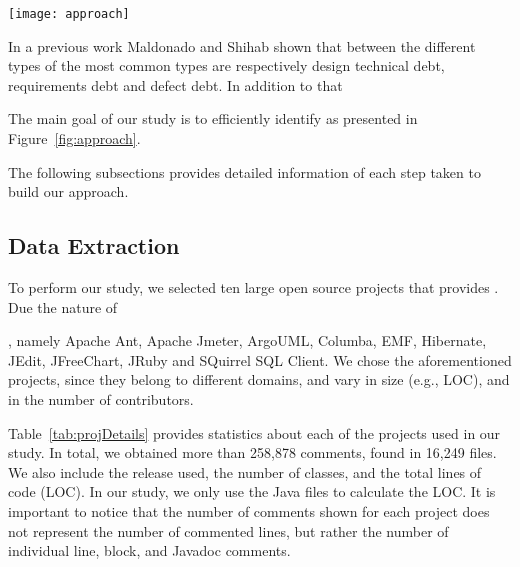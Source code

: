 \begin{figure*}[thb!]
  \centering
  \texttt{[image: approach]}
  \caption{Approach overview}
  \label{fig:approach}
\end{figure*}

In a previous work Maldonado and Shihab \cite{MaldonadoMTD2015} shown that between the different types of \SATD the most common types are respectively design technical debt, requirements debt and defect debt. In addition to that  

The main goal of our study is to efficiently identify \SATD as presented in Figure~\ref{fig:approach}. 



The following subsections provides detailed information of each step taken to build our approach.

\subsection{Data Extraction}

To perform our study, we selected ten large open source projects that provides . Due the nature of 

, namely Apache Ant, Apache Jmeter, ArgoUML, Columba, EMF, Hibernate, JEdit, JFreeChart, JRuby and SQuirrel SQL Client. We chose the aforementioned projects, since they belong to different domains, and vary in size (e.g., LOC), and in the number of contributors.

Table~\ref{tab:projDetails} provides statistics about each of the projects used in our study. In total, we obtained more than 258,878 comments, found in 16,249 files. We also include the release used, the number of classes, and the total lines of code (LOC). In our study, we only use the Java files to calculate the LOC. It is important to notice that the number of comments shown for each project does not represent the number of commented lines, but rather the number of individual line, block, and Javadoc comments. 